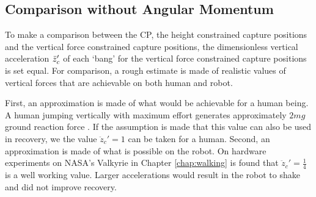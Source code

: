 \subsection{Comparison without Angular Momentum}\label{sec:capcomparenoinertia}
To make a comparison between the \ac{CP}, the height constrained capture positions and the vertical force constrained capture positions, the dimensionless vertical acceleration $\ddot{z}_{c}'$ of each `bang' for the vertical force constrained capture positions is set equal. For comparison, a rough estimate is made of realistic values of vertical forces that are achievable on both human and robot.

First, an approximation is made of what would be achievable for a human being. A human jumping vertically with maximum effort generates approximately $2mg$ ground reaction force \cite{linthorne2001analysis}. If the assumption is made that this value can also be used in recovery, we the value $\ddot{z}_c'=1$ can be taken for a human. Second, an approximation is made of what is possible on the robot. On hardware experiments on NASA's Valkyrie in Chapter \ref{chap:walking} is found that $\ddot{z}_c'=\frac{1}{4}$ is a well working value. Larger accelerations would result in the robot to shake and did not improve recovery. 

